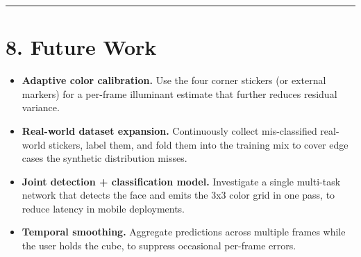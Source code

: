 \documentclass[
  11pt,
  a4paper,
]{article}
\providecommand{\tightlist}{%
  \setlength{\itemsep}{0pt}\setlength{\parskip}{0pt}}
\begin{document}
\begin{center}\rule{0.5\linewidth}{0.5pt}\end{center}

\section{8. Future Work}\label{future-work}

\begin{itemize}
\tightlist
\item
  \textbf{Adaptive color calibration.} Use the four corner stickers (or
  external markers) for a per-frame illuminant estimate that further
  reduces residual variance.
\item
  \textbf{Real-world dataset expansion.} Continuously collect
  mis-classified real-world stickers, label them, and fold them into the
  training mix to cover edge cases the synthetic distribution misses.
\item
  \textbf{Joint detection + classification model.} Investigate a single
  multi-task network that detects the face and emits the 3x3 color grid
  in one pass, to reduce latency in mobile deployments.
\item
  \textbf{Temporal smoothing.} Aggregate predictions across multiple
  frames while the user holds the cube, to suppress occasional per-frame
  errors.
\end{itemize}
\end{document}
